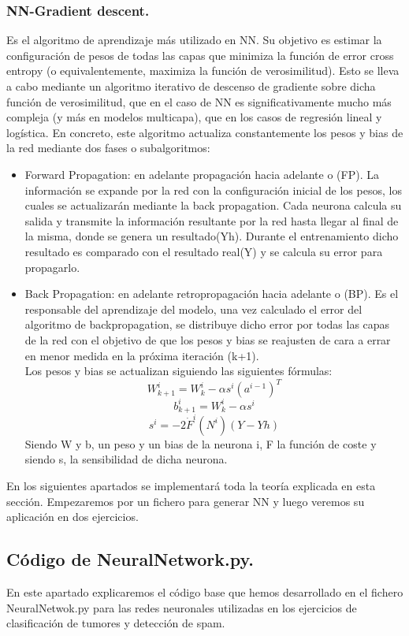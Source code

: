\documentclass[a4paper,11pt]{article}
\begin{document}
\subsubsection{NN-Gradient descent.}
Es el algoritmo de aprendizaje más utilizado en NN. Su objetivo es estimar
la configuración de pesos de todas las capas que minimiza la función de error
cross entropy (o equivalentemente, maximiza la función de verosimilitud). Esto
se lleva a cabo mediante un algoritmo iterativo de descenso de gradiente sobre
dicha función de verosimilitud, que en el caso de NN es significativamente mucho
más compleja (y más en modelos multicapa), que en los casos de regresión lineal
y logística. En concreto, este algoritmo actualiza constantemente los pesos y bias
de la red mediante dos fases o subalgoritmos:

\begin{itemize}
    \item Forward Propagation: en adelante propagación hacia adelante o (FP). La información se expande por la red con la configuración inicial de los pesos, los cuales se actualizarán mediante la back propagation. Cada neurona calcula su salida y transmite la información resultante por la red hasta llegar al final de la misma, donde se genera un resultado(Yh). Durante el entrenamiento dicho resultado es comparado con el resultado real(Y) y se calcula su error para propagarlo.
    \item Back Propagation: en adelante retropropagación hacia adelante o (BP). Es el responsable del aprendizaje del modelo, una vez calculado el error del algoritmo de backpropagation, se distribuye dicho error por todas las capas de la red con el objetivo de que los pesos y bias se reajusten de cara a errar en menor medida en la próxima iteración (k+1). \\Los pesos y bias se actualizan siguiendo las siguientes fórmulas:
    \[
    W_{k+1}^i  = W_{k}^i  - \alpha s^i (a^{i-1})^T
    \]
    \[
    b_{k+1}^i = W_{k}^i  - \alpha s^i
    \]
    \[
    s^i = -2\dot{F}^i(N^i)(Y-Yh)
    \]
    Siendo W y b, un peso y un bias de la neurona i, F la función de coste y siendo s, la sensibilidad de dicha neurona.
\end{itemize}
\noindent
En los siguientes apartados se implementará toda la teoría explicada en esta sección. Empezaremos por un fichero para generar NN y luego veremos su aplicación en dos ejercicios.
\subsection{Código de NeuralNetwork.py.}
En este apartado explicaremos el código base que hemos desarrollado en el fichero NeuralNetwok.py para las redes neuronales utilizadas en los ejercicios de clasificación de tumores y detección de spam.\\
\end{document}

